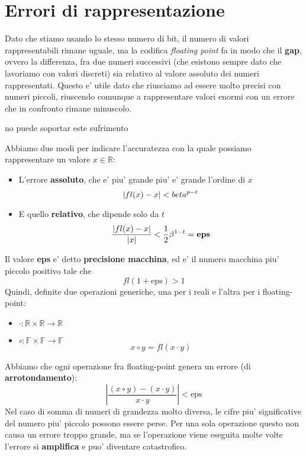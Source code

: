 \section{Errori di rappresentazione}
Dato che stiamo usando lo stesso numero di bit, il numero di valori rappresentabili rimane uguale, ma la codifica \textit{floating point} fa in modo che il \textbf{gap}, ovvero la differenza, fra due numeri successivi (che esistono sempre dato che lavoriamo con valori discreti) sia relativo al valore assoluto dei numeri rappresentati. Questo e' utile dato che riusciamo ad essere molto precisi con numeri piccoli, riuscendo comunque a rappresentare valori enormi con un errore che in confronto rimane minuscolo. 
\begin{center}
    no puede soportar este sufrimento

\end{center}
Abbiamo due modi per indicare l'accuratezza con la quale possiamo rappresentare un valore $ x \in \mathbb{R} $:
\begin{itemize}
\item L'errore \textbf{assoluto}, che e' piu' grande piu' e' grande l'ordine di $ x $
  \[
    |fl(x)-x|<\\beta^{p-t}
  \]
\item E quello \textbf{relativo}, che dipende solo da $ t $
  \[
    \frac{|fl(x)-x|}{|x|} < \frac{1}{2}\beta^{1-t} = \text{\textbf{eps}}
  \]
\end{itemize}
Il valore \textbf{eps} e' detto \textbf{precisione macchina}, ed e' il numero macchina piu' piccolo positivo tale che
\[
  fl(1+\text{eps}) > 1
\]
Quindi, definite due operazioni generiche, una per i reali e l'altra per i floating-point:
\begin{itemize}
\item $ \cdot: \mathbb{R} \times \mathbb{R} \to \mathbb{R} $
\item $ \circ: \mathbb{F} \times \mathbb{F} \to \mathbb{F} $
  \[
    x \circ y = fl(x \cdot y)
  \]
\end{itemize}
Abbiamo che ogni operazione fra floating-point genera un errore (di \textbf{arrotondamento}):
\[
  \left|\frac{(x \circ y) - (x \cdot y)}{x \cdot y}\right| < \text{eps}
\]  
Nel caso di somma di numeri di grandezza molto diversa, le cifre piu' significative del numero piu' piccolo possono essere perse. Per una sola operazione questo non causa un errore troppo grande, ma se l'operazione viene eseguita molte volte l'errore si \textbf{amplifica} e puo' diventare catastrofico.
